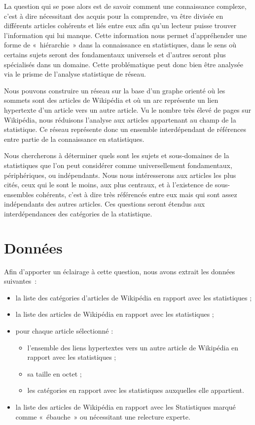 \documentclass[a4paper]{article}
\begin{document}
La question qui se pose alors est de savoir comment une connaissance complexe, c'est à dire nécessitant des acquis pour la comprendre, va être divisée en différents articles cohérents et liés entre eux afin qu'un lecteur puisse trouver l'information qui lui manque. Cette information nous permet d’appréhender une forme de «~hiérarchie~» dans la connaissance en statistiques, dans le sens où certains sujets seront des fondamentaux universels et d'autres seront plus spécialisés dans un domaine. Cette problématique peut donc bien être analysée via le prisme de l'analyse statistique de réseau.

Nous pouvons construire un réseau sur la base d'un graphe orienté où les sommets sont des articles de Wikipédia et où un arc représente un lien hypertexte d'un article vers un autre article. Vu le nombre très élevé de pages sur Wikipédia, nous réduisons l'analyse aux articles appartenant au champ de la statistique. Ce réseau représente donc un ensemble interdépendant de références entre partie de la connaissance en statistiques.

Nous chercherons à déterminer quels sont les sujets et sous-domaines de la statistiques que l'on peut considérer comme universellement fondamentaux, périphériques, ou indépendants. Nous nous intéresserons aux articles les plus cités, ceux qui le sont le moins, aux plus centraux, et à l’existence de sous-ensembles cohérents, c'est à dire très référencés entre eux mais qui sont assez indépendants des autres articles. Ces questions seront étendus aux interdépendances des catégories de la statistique.

\section{Données} 

Afin d'apporter un éclairage à cette question, nous avons extrait les données suivantes~:
\begin{itemize}
    \item la liste des catégories d'articles de Wikipédia en rapport avec les statistiques ;
    \item la liste des articles de Wikipédia en rapport avec les statistiques ;
    \item pour chaque article sélectionné :
        \begin{itemize}
            \item l'ensemble des liens hypertextes vers un autre article de Wikipédia en rapport avec les statistiques ;
            \item sa taille en octet ;
            \item les catégories en rapport avec les statistiques auxquelles elle appartient.
        \end{itemize}
    \item la liste des articles de Wikipédia en rapport avec les Statistiques marqué comme «~ébauche~» ou nécessitant une relecture experte.
\end{itemize}
\end{document}
